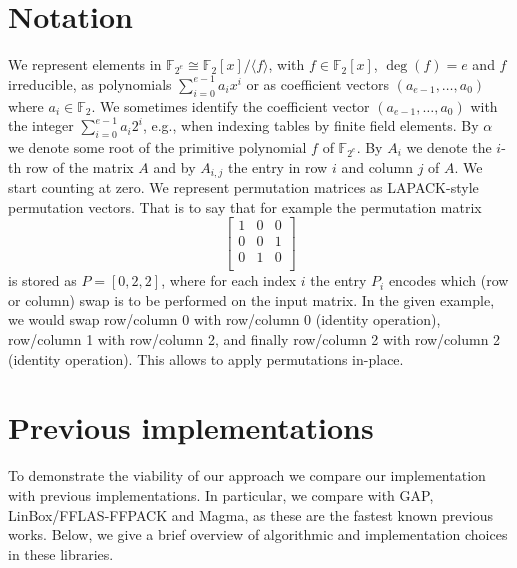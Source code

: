 \documentclass{sig-alternate}
\newcommand{\ring}[1]{\mathbb{#1}}
\newcommand{\FZ}{\ensuremath{\ring{F}_2}\xspace}
\newcommand{\FZE}{\ensuremath{\ring{F}_{2^e}}\xspace}
\begin{document}
\section{Notation} \label{sec:notation}
We represent elements in $\FZE \cong \FZ[x]/\langle f \rangle$, with $f \in \FZ[x]$, $\deg(f) = e$ and $f$ irreducible, as polynomials $\sum_{i=0}^{e-1} a_i x^i$ or as coefficient vectors $(a_{e-1},\dots,a_0)$ where $a_i \in \FZ$. We sometimes identify the coefficient vector $(a_{e-1},\dots,a_0)$ with the integer $\sum_{i=0}^{e-1} a_i2^i$, e.g., when indexing tables by finite field elements. By $\alpha$ we denote some root of the primitive polynomial $f$ of \FZE. By $A_i$ we denote the $i$-th row of the matrix $A$ and by $A_{i,j}$ the entry in row $i$ and column $j$ of $A$. We start counting at zero. We represent permutation matrices as LAPACK-style permutation vectors. That is to say that for example the permutation matrix
$$\left[ \begin{array}{ccc}
1 & 0 & 0 \\
0 & 0 & 1 \\
0 & 1 & 0 \\
\end{array} \right]$$
is stored as $P=[0, 2, 2]$, where for each index $i$ the entry $P_i$ encodes which (row or column) swap is to be performed on the input matrix. In the given example, we would swap row/column $0$ with row/column $0$ (identity operation), row/column 1 with row/column 2, and finally row/column 2 with row/column 2 (identity operation). This allows to apply permutations in-place.

\section{Previous implementations} \label{sec:others}

To demonstrate the viability of our approach we compare our implementation with previous implementations. In particular, we compare with GAP, LinBox/FFLAS-FFPACK and Magma, as these are the fastest known previous works. Below, we give a brief over\-view of algorithmic and implementation choices in these libraries.
\end{document}
